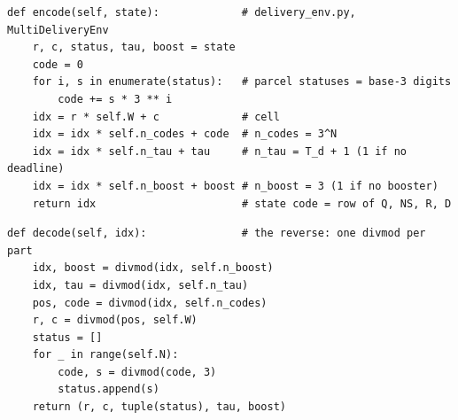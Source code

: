 \documentclass[12pt,a4paper]{article}
\begin{document}
\begin{lstlisting}
def encode(self, state):             # delivery_env.py, MultiDeliveryEnv
    r, c, status, tau, boost = state
    code = 0
    for i, s in enumerate(status):   # parcel statuses = base-3 digits
        code += s * 3 ** i
    idx = r * self.W + c             # cell
    idx = idx * self.n_codes + code  # n_codes = 3^N
    idx = idx * self.n_tau + tau     # n_tau = T_d + 1 (1 if no deadline)
    idx = idx * self.n_boost + boost # n_boost = 3 (1 if no booster)
    return idx                       # state code = row of Q, NS, R, D
\end{lstlisting}

\begin{lstlisting}
def decode(self, idx):               # the reverse: one divmod per part
    idx, boost = divmod(idx, self.n_boost)
    idx, tau = divmod(idx, self.n_tau)
    pos, code = divmod(idx, self.n_codes)
    r, c = divmod(pos, self.W)
    status = []
    for _ in range(self.N):
        code, s = divmod(code, 3)
        status.append(s)
    return (r, c, tuple(status), tau, boost)
\end{lstlisting}
\end{document}
